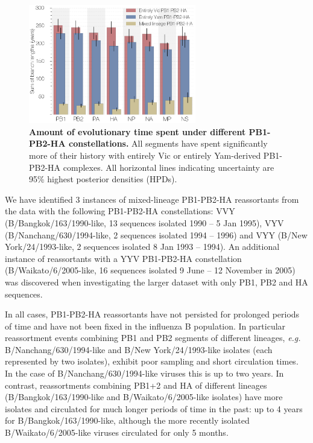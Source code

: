 \documentclass[11pt,oneside,letterpaper]{article}
\begin{document}
\begin{figure}[h]
	\centering		
	\includegraphics[width=0.65\textwidth]{figures/InfB_stateTime.png}
	\caption{\textbf{Amount of evolutionary time spent under different PB1-PB2-HA constellations.}
All segments have spent significantly more of their history with entirely Vic or entirely Yam-derived PB1-PB2-HA complexes.
All horizontal lines indicating uncertainty are 95\% highest posterior densities (HPDs).}
	\label{stateTime}
\end{figure}

We have identified 3 instances of mixed-lineage PB1-PB2-HA reassortants from the data with the following PB1-PB2-HA constellations: VVY (B/Bangkok/163/1990-like, 13 sequences isolated 1990 -- 5 Jan 1995), VYV (B/Nanchang/630/1994-like, 2 sequences isolated 1994 -- 1996) and VYY (B/New York/24/1993-like, 2 sequences isolated 8 Jan 1993 -- 1994).
An additional instance of reassortants with a YYV PB1-PB2-HA constellation (B/Waikato/6/2005-like, 16 sequences isolated 9 June -- 12 November in 2005) was discovered when investigating the larger dataset with only PB1, PB2 and HA sequences.

In all cases, PB1-PB2-HA reassortants have not persisted for prolonged periods of time and have not been fixed in the influenza B population.
In particular reassortment events combining PB1 and PB2 segments of different lineages, \textit{e.g.} B/Nanchang/630/1994-like and B/New York/24/1993-like isolates (each represented by two isolates), exhibit poor sampling and short circulation times.
In the case of B/Nanchang/630/1994-like viruses this is up to two years.
In contrast, reassortments combining PB1+2 and HA of different lineages (B/Bangkok/163/1990-like and B/Waikato/6/2005-like isolates) have more isolates and circulated for much longer periods of time in the past: up to 4 years for B/Bangkok/163/1990-like, although the more recently isolated B/Waikato/6/2005-like viruses circulated for only 5 months.
\end{document}
